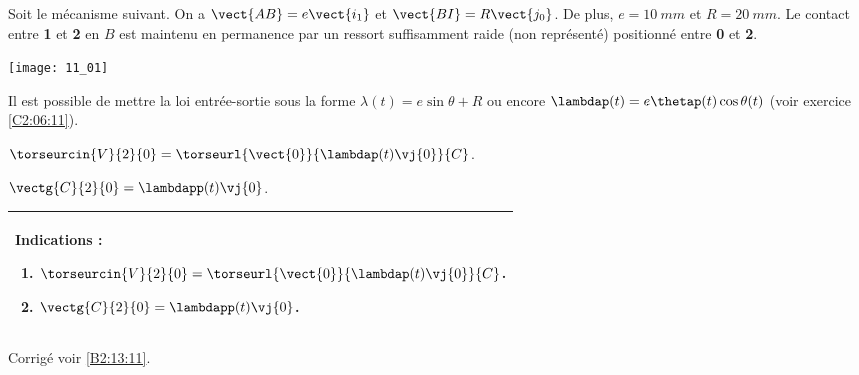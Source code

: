 \normaltrue \difficilefalse \tdifficilefalse
\correctiontrue


\setcounter{question}{0}
\ifcorrection
\else
{}
\fi

\ifprof
\else
Soit le mécanisme suivant. On a $\vect{AB}=e\vect{i_1}$ et $\vect{BI}=R\vect{j_0}$. De plus, 
$e=\SI{10}{mm}$ et $R=\SI{20}{mm}$. Le contact entre \textbf{1} et \textbf{2} en $B$ est maintenu en permanence par un ressort suffisamment raide (non représenté) positionné entre \textbf{0} et \textbf{2}. 
\begin{center}
\texttt{[image: 11\_01]}
\end{center}
\fi

Il est possible de mettre la loi entrée-sortie sous la forme $ \lambda(t) = e\sin\theta +R $
ou encore $\lambdap (t)=e\thetap(t) \cos\theta (t)$  (voir exercice \ref{C2:06:11}).


\ifprof
$\torseurcin{V}{2}{0} = \torseurl{\vect{0}}{\lambdap (t)\vj{0}}{C}$.
\else
\fi

\ifprof
$\vectg{C}{2}{0} = \lambdapp (t)\vj{0}$.
\else
\fi

\ifprof
\else
\footnotesize
\ifcolle
\else
\begin{center}
\begin{tabular}{|p{.9\linewidth}|}
\hline
Indications :
\begin{enumerate}
\item $\torseurcin{V}{2}{0} = \torseurl{\vect{0}}{\lambdap (t)\vj{0}}{C}$.
\item $\vectg{C}{2}{0} = \lambdapp (t)\vj{0}$.
\end{enumerate} \\ \hline
\end{tabular}
\end{center}
\fi
\normalsize
\begin{flushright}
\footnotesize{Corrigé  voir \ref{B2:13:11}.}
\end{flushright}%
\fi